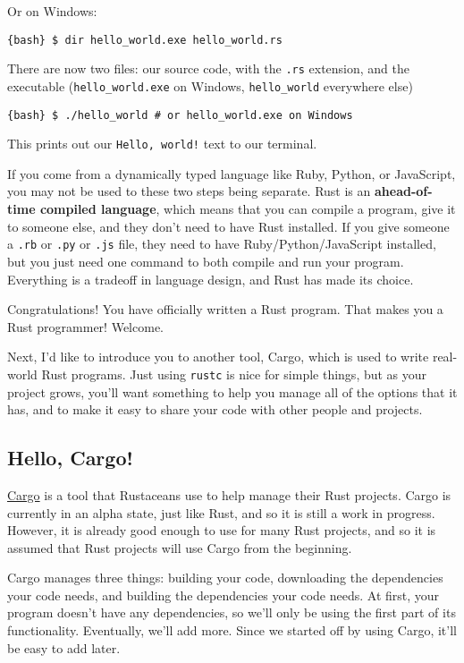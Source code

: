 \documentclass[]{article}
\begin{document}
Or on Windows:

\texttt{\{bash\} \$ dir hello\_world.exe  hello\_world.rs}

There are now two files: our source code, with the \texttt{.rs}
extension, and the executable (\texttt{hello\_world.exe} on Windows,
\texttt{hello\_world} everywhere else)

\texttt{\{bash\} \$ ./hello\_world  \# or hello\_world.exe on Windows}

This prints out our \texttt{Hello, world!} text to our terminal.

If you come from a dynamically typed language like Ruby, Python, or
JavaScript, you may not be used to these two steps being separate. Rust
is an \textbf{ahead-of-time compiled language}, which means that you can
compile a program, give it to someone else, and they don't need to have
Rust installed. If you give someone a \texttt{.rb} or \texttt{.py} or
\texttt{.js} file, they need to have Ruby/Python/JavaScript installed,
but you just need one command to both compile and run your program.
Everything is a tradeoff in language design, and Rust has made its
choice.

Congratulations! You have officially written a Rust program. That makes
you a Rust programmer! Welcome.

Next, I'd like to introduce you to another tool, Cargo, which is used to
write real-world Rust programs. Just using \texttt{rustc} is nice for
simple things, but as your project grows, you'll want something to help
you manage all of the options that it has, and to make it easy to share
your code with other people and projects.

\subsection{Hello, Cargo!}\label{hello-cargo}

\href{http://crates.io}{Cargo} is a tool that Rustaceans use to help
manage their Rust projects. Cargo is currently in an alpha state, just
like Rust, and so it is still a work in progress. However, it is already
good enough to use for many Rust projects, and so it is assumed that
Rust projects will use Cargo from the beginning.

Cargo manages three things: building your code, downloading the
dependencies your code needs, and building the dependencies your code
needs. At first, your program doesn't have any dependencies, so we'll
only be using the first part of its functionality. Eventually, we'll add
more. Since we started off by using Cargo, it'll be easy to add later.
\end{document}
